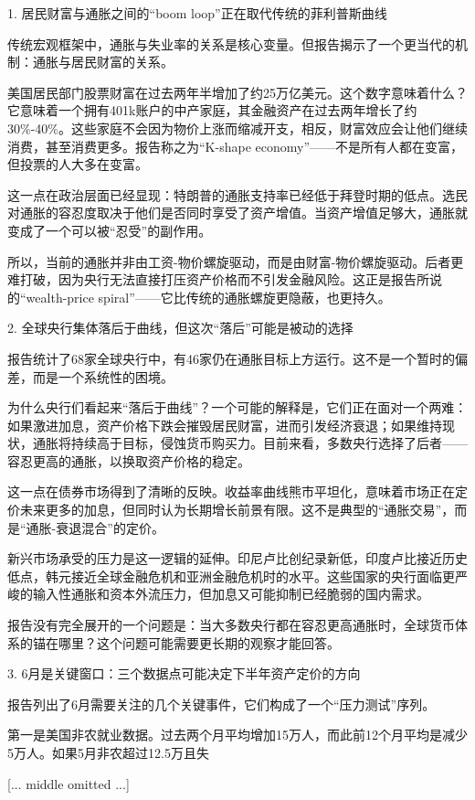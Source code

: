 \documentclass[11pt]{ctexart}
\begin{document}
1. 居民财富与通胀之间的“boom loop”正在取代传统的菲利普斯曲线

传统宏观框架中，通胀与失业率的关系是核心变量。但报告揭示了一个更当代的机制：通胀与居民财富的关系。

美国居民部门股票财富在过去两年半增加了约25万亿美元。这个数字意味着什么？它意味着一个拥有401k账户的中产家庭，其金融资产在过去两年增长了约30\%-40\%。这些家庭不会因为物价上涨而缩减开支，相反，财富效应会让他们继续消费，甚至消费更多。报告称之为“K-shape economy”——不是所有人都在变富，但投票的人大多在变富。

这一点在政治层面已经显现：特朗普的通胀支持率已经低于拜登时期的低点。选民对通胀的容忍度取决于他们是否同时享受了资产增值。当资产增值足够大，通胀就变成了一个可以被“忍受”的副作用。

所以，当前的通胀并非由工资-物价螺旋驱动，而是由财富-物价螺旋驱动。后者更难打破，因为央行无法直接打压资产价格而不引发金融风险。这正是报告所说的“wealth-price spiral”——它比传统的通胀螺旋更隐蔽，也更持久。

2. 全球央行集体落后于曲线，但这次“落后”可能是被动的选择

报告统计了68家全球央行中，有46家仍在通胀目标上方运行。这不是一个暂时的偏差，而是一个系统性的困境。

为什么央行们看起来“落后于曲线”？一个可能的解释是，它们正在面对一个两难：如果激进加息，资产价格下跌会摧毁居民财富，进而引发经济衰退；如果维持现状，通胀将持续高于目标，侵蚀货币购买力。目前来看，多数央行选择了后者——容忍更高的通胀，以换取资产价格的稳定。

这一点在债券市场得到了清晰的反映。收益率曲线熊市平坦化，意味着市场正在定价未来更多的加息，但同时认为长期增长前景有限。这不是典型的“通胀交易”，而是“通胀-衰退混合”的定价。

新兴市场承受的压力是这一逻辑的延伸。印尼卢比创纪录新低，印度卢比接近历史低点，韩元接近全球金融危机和亚洲金融危机时的水平。这些国家的央行面临更严峻的输入性通胀和资本外流压力，但加息又可能抑制已经脆弱的国内需求。

报告没有完全展开的一个问题是：当大多数央行都在容忍更高通胀时，全球货币体系的锚在哪里？这个问题可能需要更长期的观察才能回答。

3. 6月是关键窗口：三个数据点可能决定下半年资产定价的方向

报告列出了6月需要关注的几个关键事件，它们构成了一个“压力测试”序列。

第一是美国非农就业数据。过去两个月平均增加15万人，而此前12个月平均是减少5万人。如果5月非农超过12.5万且失

[... middle omitted ...]
\end{document}
